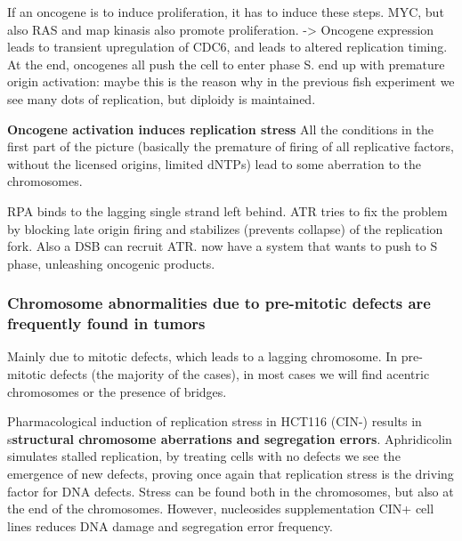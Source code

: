 If an oncogene is to induce proliferation, it has to induce these steps.
MYC, but also RAS and map kinasis also promote proliferation.
-\textgreater{} Oncogene expression leads to transient upregulation of
CDC6, and leads to altered replication timing. At the end, oncogenes all
push the cell to enter phase S.
end up with premature origin activation: maybe this is the reason why in
the previous fish experiment we see many dots of replication, but
diploidy is maintained.

\textbf{Oncogene activation induces replication stress} All the
conditions in the first part of the picture (basically the premature of
firing of all replicative factors, without the licensed origins, limited
dNTPs) lead to some aberration to the chromosomes.

RPA binds to the lagging single strand left behind.  ATR tries to fix
the problem by blocking late origin firing and stabilizes (prevents
collapse) of the replication fork. Also a DSB can recruit ATR.
now have a system that wants to push to S phase, unleashing oncogenic
products.

\hypertarget{chromosome-abnormalities-due-to-pre-mitotic-defects-are-frequently-found-in-tumors}{%
\subsubsection{Chromosome abnormalities due to pre-mitotic defects are
frequently found in
tumors}\label{chromosome-abnormalities-due-to-pre-mitotic-defects-are-frequently-found-in-tumors}}

Mainly due to mitotic defects, which leads to a lagging chromosome. In
pre-mitotic defects (the majority of the cases), in most cases we will
find acentric chromosomes or the presence of bridges.

Pharmacological induction of replication stress in HCT116 (CIN-) results
in s\textbf{structural chromosome aberrations and segregation errors}.
Aphridicolin simulates stalled replication, by treating cells with no
defects we see the emergence of new defects, proving once again that
replication stress is the driving factor for DNA defects. Stress can be
found both in the chromosomes, but also at the end of the chromosomes.
However, nucleosides supplementation CIN+ cell lines reduces DNA damage
and segregation error frequency.

